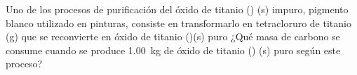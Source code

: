 Uno de los procesos de purificación del óxido de titanio () (s) impuro, pigmento blanco utilizado en pinturas, consiste en transformarlo en tetracloruro de titanio (g) que se reconvierte en óxido de titanio ()(s) puro ¿Qué masa de carbono se consume cuando se produce \SI{1,00}{\kilogram} de óxido de titanio () (s) puro según este proceso?\\
    \\
